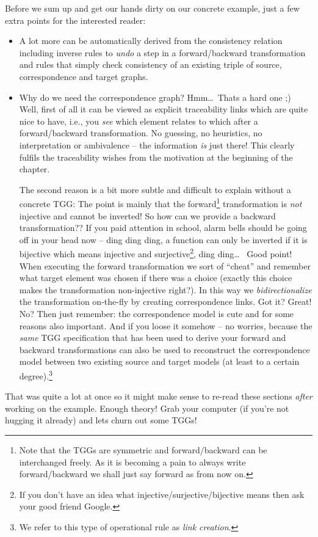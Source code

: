 \clearpage
Before we sum up and get our hands dirty on our concrete example, just a few extra points for the interested reader:  
\begin{itemize}
\item A lot more can be automatically derived from the consistency relation including inverse rules to \emph{undo} a step in a forward/backward transformation and rules that simply check consistency of an existing triple of source, correspondence and target graphs.

\item Why do we need the correspondence graph?  Hmm\dots\, Thats a hard one ;)  Well, first of all it can be viewed as explicit traceability links which are quite nice to have, i.e., you \emph{see} which element relates to which after a forward/backward transformation. 
No guessing, no heuristics, no interpretation or ambivalence -- the information \emph{is} just there!
This clearly fulfils the traceability wishes from the motivation at the beginning of the chapter.

The second reason is a bit more subtle and difficult to explain without a concrete TGG:  The point is mainly that the forward\footnote{Note that the TGGs are symmetric and forward/backward can be interchanged freely.  As it is becoming a pain to always write forward/backward we shall just say forward as from now on.} transformation is \emph{not} injective and cannot be inverted!
So how can we provide a backward transformation??
If you paid attention in school, alarm bells should be going off in your head now -- ding ding ding, a function can only be inverted if it is bijective which means injective and surjective\footnote{If you don't have an idea what injective/surjective/bijective means then ask your good friend Google.}, ding ding\ldots~
Good point!  When executing the forward transformation we sort of ``cheat'' and remember what target element was chosen if there was a choice (exactly this choice makes the transformation non-injective right?).
In this way we \emph{bidirectionalize} the transformation on-the-fly by creating correspondence links.
Got it? Great! No?  Then just remember: the correspondence model is cute and for some reasons also important.
And if you loose it somehow -- no worries, because the \emph{same} TGG specification that has been used to derive your forward and backward transformations can also be used to reconstruct the correspondence model between two existing source and target models (at least to a certain degree).\footnote{We refer to this type of operational rule as \emph{link creation}.}
\end{itemize}

That was quite a lot at once so it might make sense to re-read these sections \emph{after} working on the example.
Enough theory!  Grab your computer (if you're not hugging it already) and lets churn out some TGGs!
